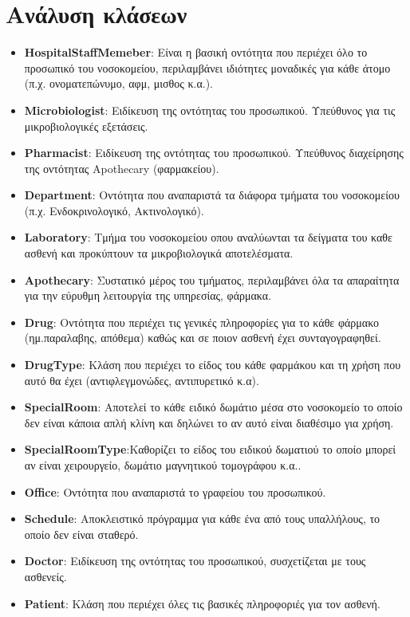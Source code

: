 \documentclass{article}
\begin{document}
\section{Ανάλυση κλάσεων}

\begin{itemize}
    \item \textbf{HospitalStaffMemeber}: Είναι η βασική οντότητα που περιέχει όλο το προσωπικό του νοσοκομείου, περιλαμβάνει ιδιότητες μοναδικές για κάθε άτομο (π.χ. ονοματεπώνυμο, αφμ, μισθος κ.α.).
    \item \textbf{Microbiologist}: Ειδίκευση της οντότητας του προσωπικού. Υπεύθυνος για τις μικροβιολογικές εξετάσεις.
    \item \textbf{Pharmacist}: Ειδίκευση της οντότητας του προσωπικού. Υπεύθυνος διαχείρησης της οντότητας Apothecary (φαρμακείου).
    \item \textbf{Department}: Οντότητα που αναπαριστά τα διάφορα τμήματα του νοσοκομείου (π.χ. Ενδοκρινολογικό, Ακτινολογικό).
    \item \textbf{Laboratory}: Τμήμα του νοσοκομείου οπου αναλύωνται τα δείγματα του καθε ασθενή και προκύπτουν τα μικροβιολογικά αποτελέσματα. 
    \item \textbf{Apothecary}: Συστατικό μέρος του τμήματος, περιλαμβάνει όλα τα απαραίτητα για την εύρυθμη λειτουργία της υπηρεσίας, φάρμακα.
    \item \textbf{Drug}: Οντότητα που περιέχει τις γενικές πληροφορίες για το κάθε φάρμακο (ημ.παραλαβης, απόθεμα) καθώς και σε ποιον ασθενή έχει συνταγογραφηθεί.
    \item \textbf{DrugType}: Κλάση που περιέχει το είδος του κάθε φαρμάκου και τη χρήση που αυτό θα έχει (αντιφλεγμονώδες, αντιπυρετικό κ.α).
    \item \textbf{SpecialRoom}: Αποτελεί το κάθε ειδικό δωμάτιο μέσα στο νοσοκομείο το οποίο δεν είναι κάποια απλή κλίνη και δηλώνει το αν αυτό είναι διαθέσιμο για χρήση.
    \item \textbf{SpecialRoomType}:Καθορίζει το είδος του ειδικού δωματιού το οποίο μπορεί αν είναι χειρουργείο, δωμάτιο μαγνητικού τομογράφου κ.α..
    \item \textbf{Office}: Οντότητα που αναπαριστά το γραφείου του προσωπικού.
    \item \textbf{Schedule}: Αποκλειστικό πρόγραμμα για κάθε ένα από τους υπαλλήλους, το οποίο δεν είναι σταθερό.
    \item \textbf{Doctor}: Ειδίκευση της οντότητας του προσωπικού, συσχετίζεται με τους ασθενείς.
    \item \textbf{Patient}: Κλάση που περιέχει όλες τις βασικές πληροφοριές για τον ασθενή.

\end{itemize}
\end{document}
